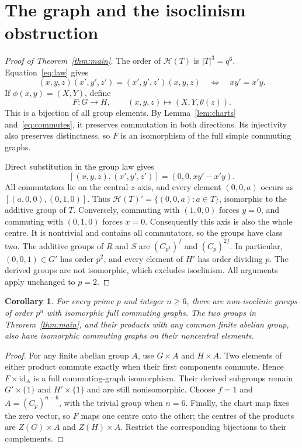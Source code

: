 \documentclass[11pt]{article}
\newtheorem{corollary}[theorem]{Corollary}
\newcommand{\HH}{\mathcal H}
\begin{document}
\section{The graph and the isoclinism obstruction}
\begin{proof}[Proof of Theorem~\ref{thm:main}]
The order of $\HH(T)$ is $|T|^3=q^6$.
Equation~\eqref{eq:law} gives
\begin{equation}\label{eq:commutes}
 (x,y,z)(x',y',z')=(x',y',z')(x,y,z)
 \quad\Longleftrightarrow\quad xy'=x'y.
\end{equation}
If $\phi(x,y)=(X,Y)$, define
\[
 F:G\longrightarrow H,\qquad (x,y,z)\longmapsto(X,Y,\theta(z)).
\]
This is a bijection of all group elements. By Lemma~\ref{lem:charts}
and~\eqref{eq:commutes}, it preserves commutation in both directions.
Its injectivity also preserves distinctness, so $F$ is an isomorphism
of the full simple commuting graphs.

Direct substitution in the group law gives
\[
 [(x,y,z),(x',y',z')]=(0,0,xy'-x'y).
\]
All commutators lie on the central $z$-axis, and every element
$(0,0,a)$ occurs as $[(a,0,0),(0,1,0)]$. Thus
$\HH(T)'=\{(0,0,a):a\in T\}$, isomorphic to the additive group of $T$.
Conversely, commuting with $(1,0,0)$ forces $y=0$, and commuting with
$(0,1,0)$ forces $x=0$. Consequently this axis is also the whole centre.
It is nontrivial and contains all commutators, so the groups have class two.
The additive groups of $R$ and $S$ are $(C_{p^2})^f$ and
$(C_p)^{2f}$. In particular, $(0,0,1)\in G'$ has order
$p^2$, and every element of $H'$ has order dividing $p$.
The derived groups are not isomorphic, which excludes isoclinism.
All arguments apply unchanged to $p=2$.
\end{proof}

\begin{corollary}\label{cor:products}
For every prime $p$ and integer $n\geq6$, there are non-isoclinic
groups of order $p^n$ with isomorphic full commuting graphs. The two
groups in Theorem~\ref{thm:main}, and their products with any common finite
abelian group, also have isomorphic commuting graphs on their noncentral elements.
\end{corollary}
\begin{proof}
For any finite abelian group $A$, use $G\times A$ and $H\times A$.
Two elements of either product commute exactly when their first components
commute. Hence $F\times\mathrm{id}_A$ is a full commuting-graph
isomorphism. Their derived subgroups remain $G'\times\{1\}$ and
$H'\times\{1\}$ and are still nonisomorphic. Choose
$f=1$ and $A=(C_p)^{n-6}$, with the trivial group when $n=6$.
Finally, the chart map fixes the zero vector, so $F$ maps one centre onto
the other; the centres of the products are $Z(G)\times A$ and $Z(H)\times A$.
Restrict the corresponding bijections to their complements.
\end{proof}
\end{document}
